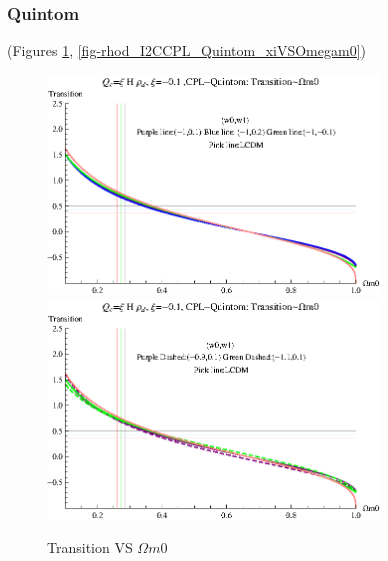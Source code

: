 \documentclass[12pt,a4paper]{article}
\begin{document}
\subsubsection{Quintom}

(Figures \ref{fig-rhod_I2CCPL_Quintom_TransVSOmegam0}, \ref{fig-rhod_I2CCPL_Quintom_xiVSOmegam0})

\begin{figure}
\centering
\includegraphics[width=250pt]{rhod_I2CCPL_Quintom_TransVSOmegam01.eps}
\includegraphics[width=250pt]{rhod_I2CCPL_Quintom_TransVSOmegam02.eps}
\caption{Transition VS $\Omega m0$}\label{fig-rhod_I2CCPL_Quintom_TransVSOmegam0}
\end{figure}
\end{document}
